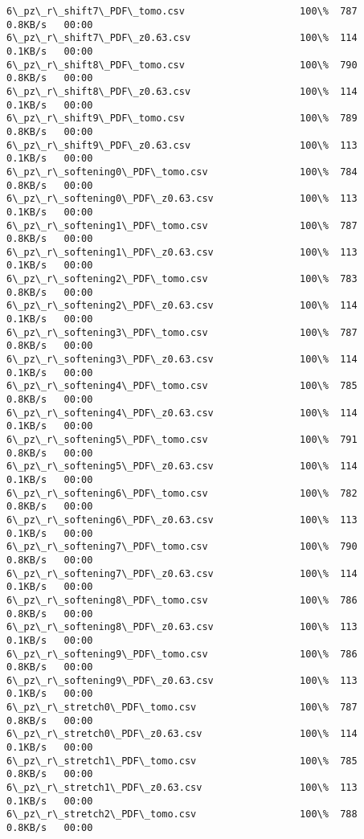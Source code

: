 \documentclass[11pt]{article}
\begin{document}
\begin{Verbatim}[commandchars=\\\{\}]
6\_pz\_r\_shift7\_PDF\_tomo.csv                    100\%  787     0.8KB/s   00:00    
6\_pz\_r\_shift7\_PDF\_z0.63.csv                   100\%  114     0.1KB/s   00:00    
6\_pz\_r\_shift8\_PDF\_tomo.csv                    100\%  790     0.8KB/s   00:00    
6\_pz\_r\_shift8\_PDF\_z0.63.csv                   100\%  114     0.1KB/s   00:00    
6\_pz\_r\_shift9\_PDF\_tomo.csv                    100\%  789     0.8KB/s   00:00    
6\_pz\_r\_shift9\_PDF\_z0.63.csv                   100\%  113     0.1KB/s   00:00    
6\_pz\_r\_softening0\_PDF\_tomo.csv                100\%  784     0.8KB/s   00:00    
6\_pz\_r\_softening0\_PDF\_z0.63.csv               100\%  113     0.1KB/s   00:00    
6\_pz\_r\_softening1\_PDF\_tomo.csv                100\%  787     0.8KB/s   00:00    
6\_pz\_r\_softening1\_PDF\_z0.63.csv               100\%  113     0.1KB/s   00:00    
6\_pz\_r\_softening2\_PDF\_tomo.csv                100\%  783     0.8KB/s   00:00    
6\_pz\_r\_softening2\_PDF\_z0.63.csv               100\%  114     0.1KB/s   00:00    
6\_pz\_r\_softening3\_PDF\_tomo.csv                100\%  787     0.8KB/s   00:00    
6\_pz\_r\_softening3\_PDF\_z0.63.csv               100\%  114     0.1KB/s   00:00    
6\_pz\_r\_softening4\_PDF\_tomo.csv                100\%  785     0.8KB/s   00:00    
6\_pz\_r\_softening4\_PDF\_z0.63.csv               100\%  114     0.1KB/s   00:00    
6\_pz\_r\_softening5\_PDF\_tomo.csv                100\%  791     0.8KB/s   00:00    
6\_pz\_r\_softening5\_PDF\_z0.63.csv               100\%  114     0.1KB/s   00:00    
6\_pz\_r\_softening6\_PDF\_tomo.csv                100\%  782     0.8KB/s   00:00    
6\_pz\_r\_softening6\_PDF\_z0.63.csv               100\%  113     0.1KB/s   00:00    
6\_pz\_r\_softening7\_PDF\_tomo.csv                100\%  790     0.8KB/s   00:00    
6\_pz\_r\_softening7\_PDF\_z0.63.csv               100\%  114     0.1KB/s   00:00    
6\_pz\_r\_softening8\_PDF\_tomo.csv                100\%  786     0.8KB/s   00:00    
6\_pz\_r\_softening8\_PDF\_z0.63.csv               100\%  113     0.1KB/s   00:00    
6\_pz\_r\_softening9\_PDF\_tomo.csv                100\%  786     0.8KB/s   00:00    
6\_pz\_r\_softening9\_PDF\_z0.63.csv               100\%  113     0.1KB/s   00:00    
6\_pz\_r\_stretch0\_PDF\_tomo.csv                  100\%  787     0.8KB/s   00:00    
6\_pz\_r\_stretch0\_PDF\_z0.63.csv                 100\%  114     0.1KB/s   00:00    
6\_pz\_r\_stretch1\_PDF\_tomo.csv                  100\%  785     0.8KB/s   00:00    
6\_pz\_r\_stretch1\_PDF\_z0.63.csv                 100\%  113     0.1KB/s   00:00    
6\_pz\_r\_stretch2\_PDF\_tomo.csv                  100\%  788     0.8KB/s   00:00    

\end{Verbatim}
\end{document}
